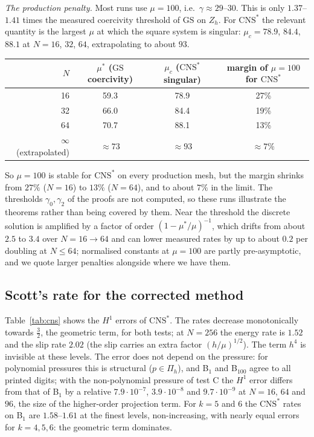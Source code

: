 \documentclass[pdflatex,sn-mathphys-num]{sn-jnl}
\theoremstyle{thmstyleone}
\theoremstyle{thmstylethree}
\newcommand{\Pih}{\Pi_h}
\newcommand{\Zh}{Z_h}
\newcommand{\GS}{\mathrm{GS}}
\newcommand{\CNS}{\mathrm{CNS}^\ast}
\begin{document}
\emph{The production penalty.} Most runs use $\mu=100$, i.e.\ $\gamma\approx29$--$30$. This is only $1.37$--$1.41$ times the measured coercivity threshold of $\GS$ on $\Zh$. For $\CNS$ the relevant quantity is the largest $\mu$ at which the square system is singular: $\mu_c=78.9$, $84.4$, $88.1$ at $N=16$, $32$, $64$, extrapolating to about $93$. \begin{center}\small
\setlength{\tabcolsep}{3pt}\begin{tabular}{rccc}
\toprule
$N$ & $\mu^\ast$ ($\GS$ coercivity) & $\mu_c$ ($\CNS$ singular) & margin of $\mu=100$ for $\CNS$\\
\midrule
16 & 59.3 & 78.9 & 27\%\\
32 & 66.0 & 84.4 & 19\%\\
64 & 70.7 & 88.1 & 13\%\\
$\infty$ (extrapolated) & $\approx73$ & $\approx93$ & $\approx7\%$\\
\bottomrule
\end{tabular}
\end{center}
So $\mu=100$ is stable for $\CNS$ on every production mesh, but the margin shrinks from $27\%$ ($N=16$) to $13\%$ ($N=64$), and to about $7\%$ in the limit. The thresholds $\gamma_0,\gamma_2$ of the proofs are not computed, so these runs illustrate the theorems rather than being covered by them. Near the threshold the discrete solution is amplified by a factor of order $(1-\mu^\ast/\mu)^{-1}$, which drifts from about $2.5$ to $3.4$ over $N=16\to64$ and can lower measured rates by up to about $0.2$ per doubling at $N\le64$; normalised constants at $\mu=100$ are partly pre-asymptotic, and we quote larger penalties alongside where we have them.

\subsection{Scott's rate for the corrected method}
Table~\ref{tab:cns} shows the $H^1$ errors of $\CNS$. The rates decrease monotonically towards $\frac32$, the geometric term, for both tests; at $N=256$ the energy rate is $1.52$ and the slip rate $2.02$ (the slip carries an extra factor $(h/\mu)^{1/2}$). The term $h^4$ is invisible at these levels. The error does not depend on the pressure: for polynomial pressures this is structural ($p\in\Pih$), and B$_1$ and B$_{100}$ agree to all printed digits; with the non-polynomial pressure of test C the $H^1$ error differs from that of B$_1$ by a relative $7.9\cdot10^{-7}$, $3.9\cdot10^{-8}$ and $9.7\cdot10^{-9}$ at $N=16$, $64$ and $96$, the size of the higher-order projection term. For $k=5$ and $6$ the $\CNS$ rates on B$_1$ are $1.58$--$1.61$ at the finest levels, non-increasing, with nearly equal errors for $k=4,5,6$: the geometric term dominates.
\end{document}
